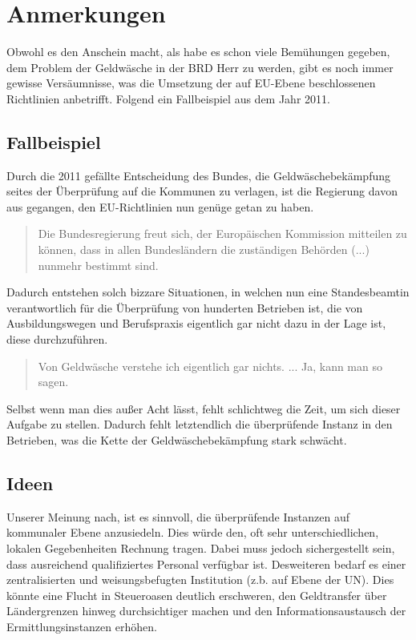 \documentclass{article}
\begin{document}
\newpage

    \section[Anmerkungen]{Anmerkungen}

        Obwohl es den Anschein macht, als habe es schon viele Bemühungen gegeben, dem Problem der Geldwäsche in der BRD Herr zu werden, gibt es noch immer gewisse Versäumnisse, was die Umsetzung der auf EU-Ebene beschlossenen Richtlinien anbetrifft. Folgend ein Fallbeispiel aus dem Jahr 2011.

        \subsection[Fallbeispiel]{Fallbeispiel}

            Durch die 2011 gefällte Entscheidung des Bundes, die Geldwäschebekämpfung seites der Überprüfung auf die Kommunen zu verlagen, ist die Regierung davon aus gegangen, den EU-Richtlinien nun genüge getan zu haben.
            \begin{quote} Die Bundesregierung freut sich, der Europäischen Kommission mitteilen zu können, dass in allen Bundesländern die zuständigen Behörden (...) nunmehr bestimmt sind. \cite{EUZeugs} \end{quote}
            Dadurch entstehen solch bizzare Situationen, in welchen nun eine Standesbeamtin verantwortlich für die Überprüfung von hunderten Betrieben ist, die von Ausbildungswegen und Berufspraxis eigentlich gar nicht dazu in der Lage ist, diese durchzuführen. \begin{quote} Von Geldwäsche verstehe ich eigentlich gar nichts. ... Ja, kann man so sagen. \cite{Beatmin} \end{quote} Selbst wenn man dies außer Acht lässt, fehlt schlichtweg die Zeit, um sich dieser Aufgabe zu stellen. Dadurch fehlt letztendlich die überprüfende Instanz in den Betrieben, was die Kette der Geldwäschebekämpfung stark schwächt.

        \subsection[Ideen]{Ideen}
        
            Unserer Meinung nach, ist es sinnvoll, die überprüfende Instanzen auf kommunaler Ebene anzusiedeln. Dies würde den, oft sehr unterschiedlichen, lokalen Gegebenheiten Rechnung tragen. Dabei muss jedoch sichergestellt sein, dass ausreichend qualifiziertes Personal verfügbar ist.
            Desweiteren bedarf es einer zentralisierten und weisungsbefugten Institution (z.b. auf Ebene der UN). Dies könnte eine Flucht in Steueroasen deutlich erschweren, den Geldtransfer über Ländergrenzen hinweg durchsichtiger machen und den Informationsaustausch der Ermittlungsinstanzen erhöhen.
\end{document}
